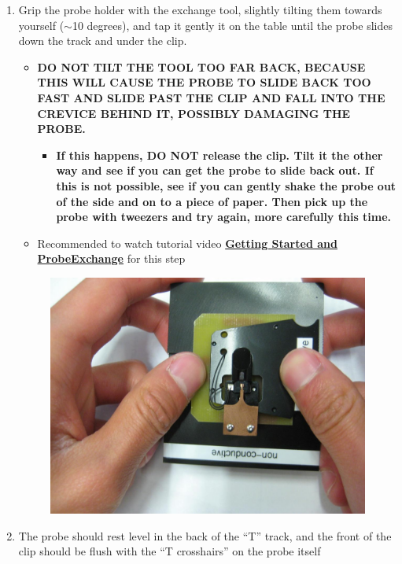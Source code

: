 \documentclass{../lab}
\begin{document}
\begin{enumerate}
    \item  Grip the probe holder with the exchange tool, slightly tilting them towards yourself ($\sim$10 degrees), and tap it gently it on the table until the probe slides down the track and under the clip.
    
    \begin{itemize}
        \item \textbf{DO NOT TILT THE TOOL TOO FAR BACK, BECAUSE THIS WILL CAUSE THE PROBE TO SLIDE BACK TOO FAST AND SLIDE PAST THE CLIP AND FALL INTO THE CREVICE BEHIND IT, POSSIBLY DAMAGING THE PROBE.}
        \begin{itemize}
            \item \textbf{If this happens, DO NOT release the clip. Tilt it the other way and see if you can get the probe to slide back out.  If this is not possible, see if you can gently shake the probe out of the side and on to a piece of paper. Then pick up the probe with tweezers and try again, more carefully this time.}
        \end{itemize}
    
        \item Recommended to watch tutorial video \href{http://experimentationlab.berkeley.edu/sites/default/files/gettingstarted\_final2.mp4}{\textbf{Getting Started and Probe}}\href{http://experimentationlab.berkeley.edu/sites/default/files/gettingstarted\_final2.mp4}{\textbf{Exchange}} for this step
    \end{itemize}
    
    \begin{figure}[H]
        \centering
        \href{http://experimentationlab.berkeley.edu/sites/default/files/AFMImages/22.JPG}{\includegraphics[width=0.5\linewidth]{images/22.JPG}}
        \caption{}
        \label{fig:22}
    \end{figure}
    
    \item  The probe should rest level in the back of the ``T'' track, and the front of the clip should be flush with the ``T crosshairs'' on the probe itself
    

\end{enumerate}
\end{document}
